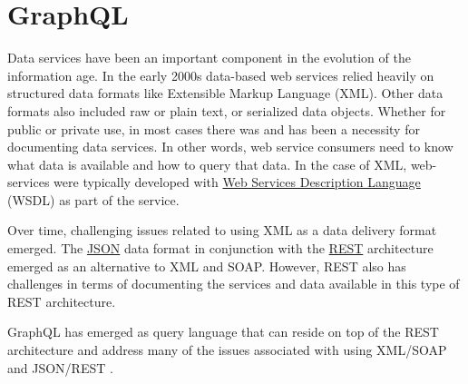 \section{GraphQL}

Data services have been an important component in the evolution of the 
information age.  In the early 2000s data-based web services relied heavily on
structured data formats like Extensible Markup Language (XML).  Other data 
formats also included raw or plain text, or serialized data objects.  Whether for 
public or private use, in most cases there was and has been a necessity for 
documenting data services.  In other words, web service consumers need to know 
what data is available and how to query that data.  In the case of XML,
web-services were typically developed with \href{https://en.wikipedia.org/wiki/Web_Services_Description_Language}
{Web Services Description Language} (WSDL) as part of the service.  

Over time, challenging issues related to using XML as a data delivery format 
emerged.  The \href{https://en.wikipedia.org/wiki/JSON}{JSON} data format in 
conjunction with the \href{https://en.wikipedia.org/wiki/Representational_state_transfer}{REST} 
architecture emerged as an alternative to XML and SOAP.  However, REST also has 
challenges in terms of documenting the services and data available in this 
type of REST architecture.

GraphQL has emerged as query language that can reside on top of the REST 
architecture and address many of the issues associated with using XML/SOAP and 
JSON/REST \cite{GraphQL2018}.
